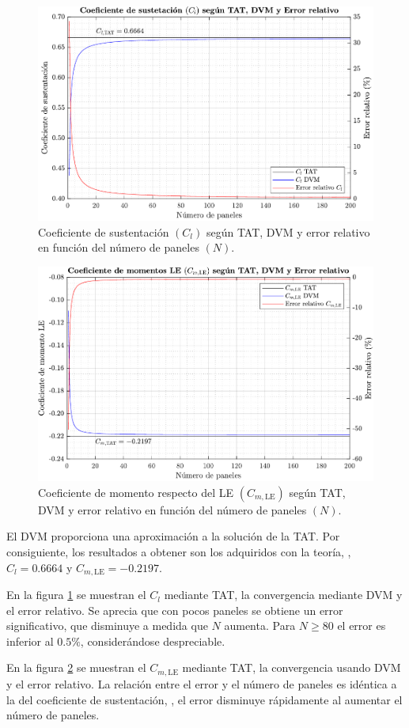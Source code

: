\begin{figure}[ht] 
    \centering
    \includegraphics[width=\linewidth]{imagenes/verificacion2/verificacion_cl.pdf}
    \caption{Coeficiente de sustentación $\left( C_l \right)$ según TAT, DVM y error relativo en función del número de paneles $\left( N \right)$.}
    \label{fig:verificacion_cl}
\end{figure}

\begin{figure}[ht]
    \centering
    \includegraphics[width=\linewidth]{imagenes/verificacion2/verificacion_cmle.pdf}
    \caption{Coeficiente de momento respecto del LE $\left( C_{m,\text{LE}} \right)$ según TAT, DVM y error relativo en función del número de paneles $\left( N \right)$.}
    \label{fig:verificacion_cmle}
\end{figure}

El DVM proporciona una aproximación a la solución de la TAT. Por consiguiente, los resultados a obtener son los adquiridos con la teoría, \ie, $C_l = 0.6664$ y $C_{m,\text{LE}} = -0.2197$.

En la figura \ref{fig:verificacion_cl} se muestran el $C_l$ mediante TAT, la convergencia mediante DVM y el error relativo. Se aprecia que con pocos paneles se obtiene un error significativo, que disminuye a medida que $N$ aumenta. Para $N \geq 80$ el error es inferior al $0.5\%$, considerándose despreciable.

En la figura \ref{fig:verificacion_cmle} se muestran el $C_{m,\text{LE}}$ mediante TAT, la convergencia usando DVM y el error relativo. La relación entre el error y el número de paneles es idéntica a la del coeficiente de sustentación, \ie, el error disminuye rápidamente al aumentar el número de paneles.